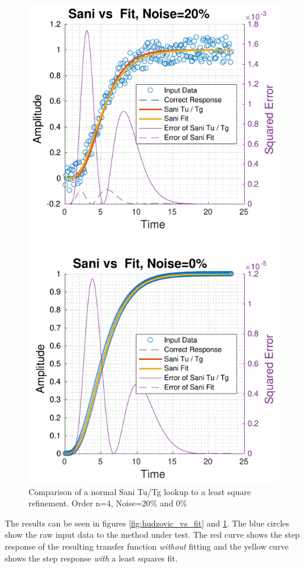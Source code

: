 \begin{figure}[t]
    \includegraphics[width=\linewidth]{images/sani_vs_fit}
    \caption{Comparison of a normal Sani Tu/Tg lookup to a least square refinement. Order n=4, Noise=20\% and 0\%}
    \label{fig:sani_vs_fit}
\end{figure}

The   results   can   be   seen   in   figures   \ref{fig:hudzovic_vs_fit}   and
\ref{fig:sani_vs_fit}. The blue circles show the raw  input  data  to the method
under test. The red  curve  shows  the  step  response of the resulting transfer
function \textit{without} fitting and the yellow curve  shows  the step response
\textit{with} a least squares fit.

